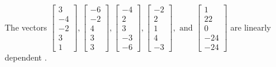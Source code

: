 \begin{exercise}
\begin{exerciseStatement}
  \end{exerciseStatement}
  \begin{exerciseAnswer}
   The vectors \(\left[\begin{array}{r}
3 \\
-4 \\
-2 \\
3 \\
1
\end{array}\right] , \left[\begin{array}{r}
-6 \\
-2 \\
4 \\
3 \\
3
\end{array}\right] , \left[\begin{array}{r}
-4 \\
2 \\
3 \\
-3 \\
-6
\end{array}\right] , \left[\begin{array}{r}
-2 \\
2 \\
1 \\
4 \\
-3
\end{array}\right] , \text{ and } \left[\begin{array}{r}
1 \\
22 \\
0 \\
-24 \\
-24
\end{array}\right]\) are 
  	 linearly dependent  .
  


  \end{exerciseAnswer}
\end{exercise}